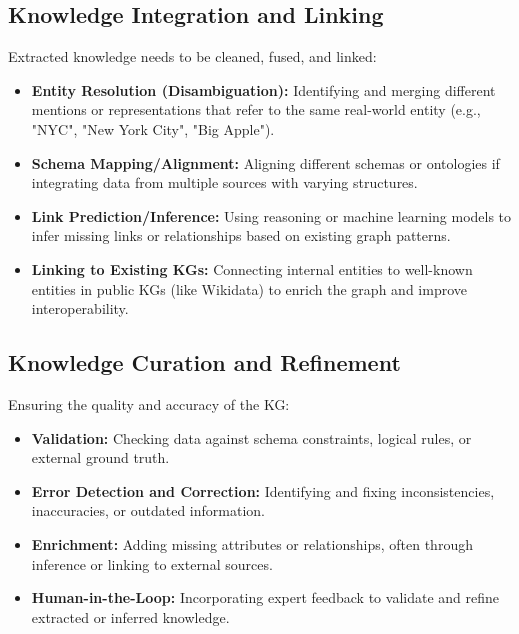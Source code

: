 \documentclass[11pt, a4paper]{article}
\begin{document}
\subsection{Knowledge Integration and Linking}
\label{subsec:integration}
Extracted knowledge needs to be cleaned, fused, and linked:
\begin{itemize}
    \item \textbf{Entity Resolution (Disambiguation):} Identifying and merging different mentions or representations that refer to the same real-world entity (e.g., "NYC", "New York City", "Big Apple").
    \item \textbf{Schema Mapping/Alignment:} Aligning different schemas or ontologies if integrating data from multiple sources with varying structures.
    \item \textbf{Link Prediction/Inference:} Using reasoning or machine learning models to infer missing links or relationships based on existing graph patterns.
    \item \textbf{Linking to Existing KGs:} Connecting internal entities to well-known entities in public KGs (like Wikidata) to enrich the graph and improve interoperability.
\end{itemize}

\subsection{Knowledge Curation and Refinement}
\label{subsec:curation}
Ensuring the quality and accuracy of the KG:
\begin{itemize}
    \item \textbf{Validation:} Checking data against schema constraints, logical rules, or external ground truth.
    \item \textbf{Error Detection and Correction:} Identifying and fixing inconsistencies, inaccuracies, or outdated information.
    \item \textbf{Enrichment:} Adding missing attributes or relationships, often through inference or linking to external sources.
    \item \textbf{Human-in-the-Loop:} Incorporating expert feedback to validate and refine extracted or inferred knowledge.
\end{itemize}
\end{document}
